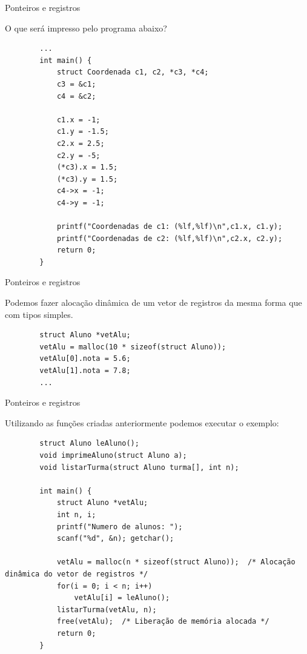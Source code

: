 \documentclass[handout]{beamer}
\begin{document}
\begin{frame}[fragile]{Ponteiros e registros}

    O que será impresso pelo programa abaixo?
    \vspace{-1em}
    \begin{verbatim}
        ...
        int main() {
            struct Coordenada c1, c2, *c3, *c4;
            c3 = &c1;
            c4 = &c2;

            c1.x = -1;
            c1.y = -1.5;
            c2.x = 2.5;
            c2.y = -5;
            (*c3).x = 1.5;
            (*c3).y = 1.5;
            c4->x = -1;
            c4->y = -1;

            printf("Coordenadas de c1: (%lf,%lf)\n",c1.x, c1.y);
            printf("Coordenadas de c2: (%lf,%lf)\n",c2.x, c2.y);
            return 0;
        }
    \end{verbatim}
\end{frame}

\begin{frame}[fragile]{Ponteiros e registros}

    Podemos fazer alocação dinâmica de um vetor de registros
    da mesma forma que com tipos simples.

    \begin{verbatim}
        struct Aluno *vetAlu;
        vetAlu = malloc(10 * sizeof(struct Aluno));
        vetAlu[0].nota = 5.6;
        vetAlu[1].nota = 7.8;
        ...
    \end{verbatim}

\end{frame}

\begin{frame}[fragile]{Ponteiros e registros}

    Utilizando as funções criadas anteriormente podemos executar o exemplo:
    \vspace{-1em}
    \begin{verbatim}
        struct Aluno leAluno();
        void imprimeAluno(struct Aluno a);
        void listarTurma(struct Aluno turma[], int n);

        int main() {
            struct Aluno *vetAlu;
            int n, i;
            printf("Numero de alunos: ");
            scanf("%d", &n); getchar();

            vetAlu = malloc(n * sizeof(struct Aluno));  /* Alocação dinâmica do vetor de registros */
            for(i = 0; i < n; i++)
                vetAlu[i] = leAluno();
            listarTurma(vetAlu, n);
            free(vetAlu);  /* Liberação de memória alocada */
            return 0;
        }
    \end{verbatim}

\end{frame}
\end{document}
